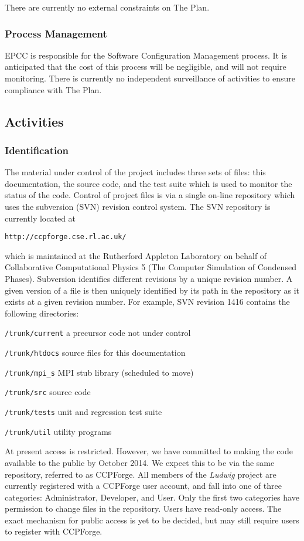 \documentclass[11pt,twoside]{article}
\begin{document}
There are currently no external constraints on The Plan.

\subsubsection{Process Management}

EPCC is responsible for the Software Configuration Management process.
It is anticipated that the cost of this process will be negligible, and
will not require monitoring. There is currently no independent
surveillance of activities to ensure compliance with The Plan.

\subsection{Activities}

\subsubsection{Identification}

The material under control of the project includes three sets of files:
this documentation, the source code, and the test suite which is used
to monitor the status of the code.
Control of project files is via a single on-line repository which
uses the subversion (SVN) revision control system. The SVN repository
is currently located at

\texttt{http://ccpforge.cse.rl.ac.uk/}

which is maintained at the Rutherford Appleton Laboratory on behalf
of Collaborative Computational Physics 5 (The Computer Simulation of
Condensed Phases). Subversion identifies different revisions by a
unique revision number. A given version of a file is then uniquely
identified by its path in the repository as it exists at a given
revision number. For example, SVN revision 1416 contains the
following directories:

\texttt{/trunk/current} a precursor code not under control

\texttt{/trunk/htdocs} source files for this documentation

\texttt{/trunk/mpi\_s} MPI stub library (scheduled to move)

\texttt{/trunk/src} source code

\texttt{/trunk/tests} unit and regression test suite

\texttt{/trunk/util} utility programs

At present access is restricted. However, we have committed to making
the code available to the public by October 2014. We expect this to
be via the same repository, referred to as CCPForge.
All members of the \textit{Ludwig} project are currently registered with
a CCPForge user account, and fall into one of three categories:
Administrator, Developer, and User. Only the first two categories have
permission to change files in the repository. Users have read-only
access. The exact mechanism for public access is yet to be decided,
but may still require users to register with CCPForge.
\end{document}
